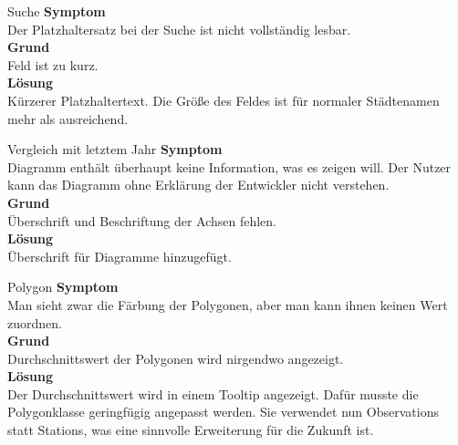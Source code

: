     \begin{Bug}{Suche}
      \textbf{Symptom}\\
      Der Platzhaltersatz bei der Suche ist nicht vollständig lesbar.\\
      \linebreak
      \textbf{Grund}\\
      Feld  ist zu kurz.\\
      \linebreak
      \textbf{Lösung}\\
      Kürzerer Platzhaltertext. Die Größe des Feldes ist für normaler Städtenamen mehr als ausreichend.\\
    \end{Bug}
      
    \begin{Bug}{Vergleich mit letztem Jahr}
      \textbf{Symptom}\\
      Diagramm enthält überhaupt keine Information, was es zeigen will. Der Nutzer kann das Diagramm ohne Erklärung der Entwickler nicht verstehen.\\
      \linebreak
      \textbf{Grund}\\
      Überschrift und Beschriftung der Achsen fehlen.\\
      \linebreak
      \textbf{Lösung}\\
      Überschrift für Diagramme hinzugefügt.\\
    \end{Bug}

    \begin{Bug}{Polygon}
      \textbf{Symptom}\\
      Man sieht zwar die Färbung der Polygonen, aber man kann ihnen keinen Wert zuordnen.\\
      \linebreak
      \textbf{Grund}\\
      Durchschnittswert der Polygonen wird nirgendwo angezeigt.\\
      \linebreak
      \textbf{Lösung}\\
      Der Durchschnittswert wird in einem Tooltip angezeigt. Dafür musste die Polygonklasse geringfügig
      angepasst werden. Sie verwendet nun Observations statt Stations, was eine sinnvolle Erweiterung für die Zukunft ist.\\
    \end{Bug}

